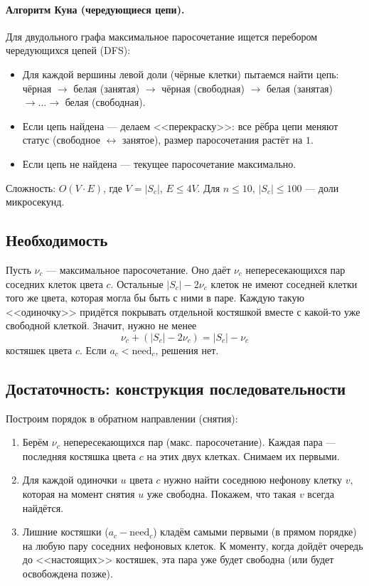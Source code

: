 \documentclass[12pt,a4paper]{article}
\begin{document}
\paragraph{Алгоритм Куна (чередующиеся цепи).}
Для двудольного графа максимальное паросочетание ищется перебором
чередующихся цепей (DFS):
\begin{itemize}
  \item Для каждой вершины левой доли (чёрные клетки) пытаемся найти
        цепь: чёрная $\to$ белая (занятая) $\to$ чёрная (свободная)
        $\to$ белая (занятая) $\to\dots\to$ белая (свободная).
  \item Если цепь найдена --- делаем <<перекраску>>: все рёбра цепи
        меняют статус (свободное $\leftrightarrow$ занятое), размер
        паросочетания растёт на $1$.
  \item Если цепь не найдена --- текущее паросочетание максимально.
\end{itemize}
Сложность: $O(V\cdot E)$, где $V=|S_c|$, $E\le 4V$. Для $n\le10$,
$|S_c|\le100$ --- доли микросекунд.

\subsection{Необходимость}

Пусть $\nu_c$ --- максимальное паросочетание. Оно даёт $\nu_c$
непересекающихся пар соседних клеток цвета $c$. Остальные
$|S_c|-2\nu_c$ клеток не имеют соседней клетки того же цвета, которая
могла бы быть с ними в паре. Каждую такую <<одиночку>> придётся
покрывать отдельной костяшкой вместе с какой-то уже свободной клеткой.
Значит, нужно не менее
\[
  \nu_c + (|S_c|-2\nu_c) = |S_c| - \nu_c
\]
костяшек цвета $c$. Если $a_c < \mathrm{need}_c$, решения нет.

\subsection{Достаточность: конструкция последовательности}

Построим порядок в обратном направлении (снятия):
\begin{enumerate}
  \item Берём $\nu_c$ непересекающихся пар (макс. паросочетание).
        Каждая пара --- последняя костяшка цвета $c$ на этих двух клетках.
        Снимаем их первыми.
  \item Для каждой одиночки $u$ цвета $c$ нужно найти соседнюю нефонову
        клетку $v$, которая на момент снятия $u$ уже свободна.
        Покажем, что такая $v$ всегда найдётся.
  \item Лишние костяшки ($a_c - \mathrm{need}_c$) кладём самыми первыми
        (в прямом порядке) на любую пару соседних нефоновых клеток.
        К моменту, когда дойдёт очередь до <<настоящих>> костяшек, эта
        пара уже будет свободна (или будет освобождена позже).
\end{enumerate}
\end{document}
